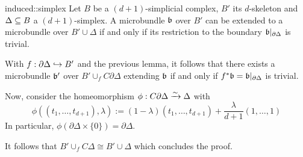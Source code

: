 \begin{mycorollary}{induced::simplex}
    Let $B$ be a $(d + 1)$-simplicial complex, $B'$ its $d$-skeleton and $\Delta \subseteq{} B$ a $(d + 1)$-simplex.
    A microbundle $\mathfrak{b}$ over $B'$ can be extended to a microbundle over $B' \cup \Delta$ if and only if its restriction to the boundary $\mathfrak{b} \vert_{\partial \Delta}$ is trivial.
\end{mycorollary}
\begin{myproof}
    With $f: \partial \Delta \hookrightarrow{} B'$ and the previous lemma,
    it follows that there exists a microbundle $\mathfrak{b}'$ over $B' \cup_f C\partial\Delta$ extending $\mathfrak{b}$ if and only if $f^*\mathfrak{b} = \mathfrak{b}\vert_{\partial\Delta}$ is trivial.

    Now, consider the homeomorphism $\phi: C\partial \Delta \xrightarrow{\sim} \Delta$ with
    \[ \phi((t_1, \dots, t_{d + 1}), \lambda) := (1 - \lambda) (t_1, \dots, t_{d + 1}) + \frac{\lambda}{d + 1} (1, \dots, 1) \]
    In particular, $\phi(\partial \Delta \times \{0\}) = \partial \Delta$.

    It follows that $B' \cup_f C\Delta \cong B' \cup \Delta$ which concludes the proof.
\end{myproof}